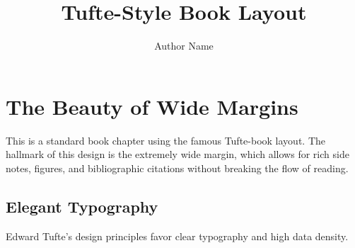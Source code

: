 \documentclass{tufte-book}
\title{Tufte-Style Book Layout}
\author{Author Name}
\begin{document}
\maketitle

\chapter{The Beauty of Wide Margins}
This is a standard book chapter using the famous Tufte-book layout. The hallmark of this design is the extremely wide margin, which allows for rich side notes, figures, and bibliographic citations without breaking the flow of reading.

\section{Elegant Typography}
Edward Tufte's design principles favor clear typography and high data density.

\begin{marginfigure}
  \centering
  \caption{A placeholder for margin figures.}
\end{marginfigure}
\end{document}
